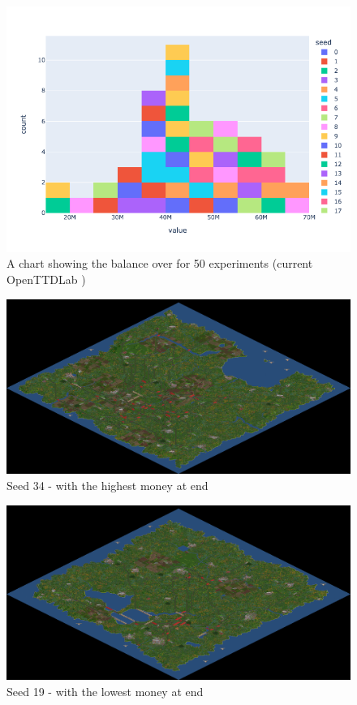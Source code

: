 \documentclass[logo,msc]{infthesis}           %
\begin{document}
\begin{figure}[h]
\centering
\includegraphics[width=\columnwidth]{assets/end-of-30th-year-distribution.png}
\caption{A chart showing the balance over for 50 experiments (current OpenTTDLab )}
\label{fig:first-year}
\end{figure}

\begin{figure}[h]
\centering
\includegraphics[width=\columnwidth]{assets/34_small.png}
\caption{Seed 34 - with the highest money at end}
\label{fig:openttd}
\end{figure}

\begin{figure}[h]
\centering
\includegraphics[width=\columnwidth]{assets/19_small.png}
\caption{Seed 19 - with the lowest money at end}
\label{fig:openttd}
\end{figure}
\end{document}
